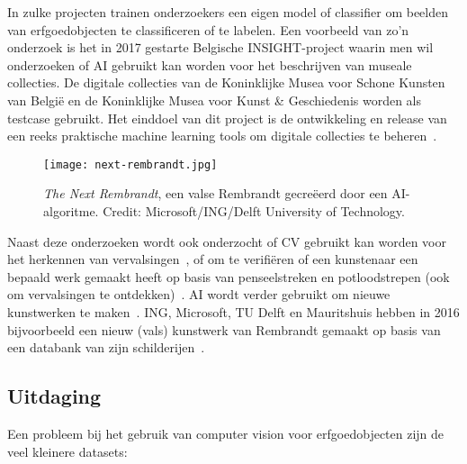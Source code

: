 In zulke projecten trainen onderzoekers een eigen model of classifier om beelden van erfgoedobjecten te classificeren of te labelen. Een voorbeeld van zo’n onderzoek is het in 2017 gestarte Belgische INSIGHT-project waarin men wil onderzoeken of AI gebruikt kan worden voor het beschrijven van museale collecties. De digitale collecties van de Koninklijke Musea voor Schone Kunsten van Belgi\"{e} en de Koninklijke Musea voor Kunst \& Geschiedenis worden als testcase gebruikt. Het einddoel van dit project is de ontwikkeling en release van een reeks praktische machine learning tools om digitale collecties te beheren~\autocite{UniAntwerpen2017?}.

\begin{figure}
	\centering
	\texttt{[image: next-rembrandt.jpg]}
	\caption[\textit{The Next Rembrandt}, een valse Rembrandt gecreëerd door een AI-algoritme]{\textit{The Next Rembrandt}, een valse Rembrandt gecreëerd door een AI-algoritme. Credit: Microsoft/ING/Delft University of Technology.}
\end{figure}

Naast deze onderzoeken wordt ook onderzocht of CV gebruikt kan worden voor het herkennen van vervalsingen~\autocite{Dickson2018}, of om te verifi\"{e}ren of een kunstenaar een bepaald werk gemaakt heeft op basis van penseelstreken en potloodstrepen (ook om vervalsingen te ontdekken)~\autocite{Elgammal2017}. AI wordt verder gebruikt om nieuwe kunstwerken te maken~\autocite{Dickson2019}. ING, Microsoft, TU Delft en Mauritshuis hebben in 2016 bijvoorbeeld een nieuw (vals) kunstwerk van Rembrandt gemaakt op basis van een databank van zijn schilderijen~\autocite{ING2016}.

\subsection{Uitdaging}
\label{subsec:cv-voor-ce-uitdaging}

Een probleem bij het gebruik van computer vision voor erfgoedobjecten zijn de veel kleinere datasets: 

